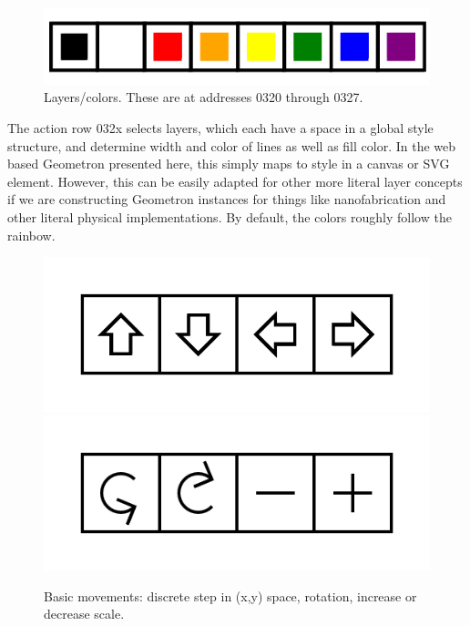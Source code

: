 \documentclass[11pt]{article}
\begin{document}
\begin{figure}

\includegraphics[width=\linewidth]{figures/figure10_layers.png}

\caption{Layers/colors.  These are at addresses 0320 through 0327.}
\end{figure}


    The action row 032x selects layers, which each have a space in a global style structure, and determine width and color of lines as well as fill color. In the web based Geometron presented here, this simply maps to style in a canvas or SVG element.  However, this can be easily adapted for other more literal layer concepts if we are constructing Geometron instances for things like nanofabrication and other literal physical implementations.  By default, the colors roughly follow the rainbow.




\begin{figure}

\includegraphics[width=\linewidth]{figures/figure11a_movements.png}
\includegraphics[width=\linewidth]{figures/figure11b_rotationscale.png}

\caption{Basic movements: discrete step in (x,y) space, rotation, increase or decrease scale.}
\end{figure}
\end{document}
